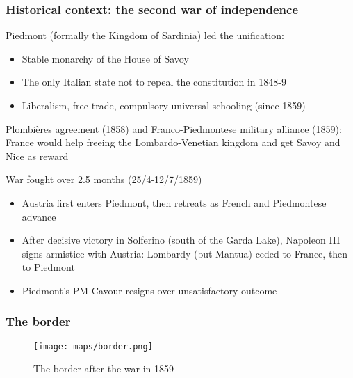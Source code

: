 \documentclass[10pt]{beamer}
\begin{document}
\begin{frame}
    \frametitle{Historical context: the second war of independence}
    
    Piedmont (formally the Kingdom of Sardinia) led the unification:
    \begin{itemize}
        \item Stable monarchy of the House of Savoy
        \item The only Italian state not to repeal the constitution in 1848-9
        \item Liberalism, free trade, compulsory universal schooling (since 1859)
    \end{itemize}

    \pause
    
    \bigskip

    Plombières agreement (1858) and Franco-Piedmontese military alliance (1859): France would help freeing the Lombardo-Venetian kingdom and get Savoy and Nice as reward

    \bigskip
    War fought over 2.5 months (25/4-12/7/1859)
    \begin{itemize}
        \item Austria first enters Piedmont, then retreats as French and Piedmontese advance
        \item After decisive victory in Solferino (south of the Garda Lake), Napoleon III signs armistice with Austria: Lombardy (but Mantua) ceded to France, then to Piedmont
        \item Piedmont's PM Cavour resigns over unsatisfactory outcome
    \end{itemize}
    
\end{frame}

\begin{frame}
    \frametitle{The border}

    \begin{figure}
        \centering
        \texttt{[image: maps/border.png]}
        \caption{The border after the war in 1859}
        \label{fig:border}
    \end{figure}

\end{frame}
\end{document}
